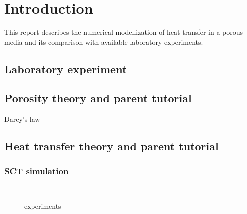
\section{Introduction}
\label{section:introduction}

This report describes the numerical modellization of heat transfer in a porous
media and its comparison with available laboratory experiments.

\subsection{Laboratory experiment}
\label{subsection:laboratoryexperiment}



\subsection{Porosity theory and parent tutorial}
\label{subsection:porositytheorytutorial}

Darcy's law

\subsection{Heat transfer theory and parent tutorial}
\label{subsection:heattransfertheorytutorial}


\cite{ReportRamin, OFWikicht, ReportTempel, ReportReveillon, OForgFv,
Soulaine, RegionProbe, Permeability, ReportHofer}

\subsubsection{SCT simulation}
\label{subsubsection:sctsimulation}



\begin{figure}[!h]
\centering
{} \quad  %
{} \\  
\caption[experiments]{experiments}
\label{fig:experiments}
\end{figure}